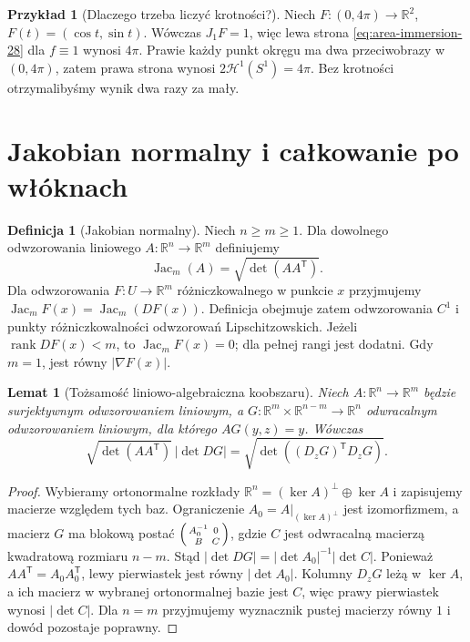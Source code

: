 \documentclass[11pt,a4paper,oneside]{book}
\numberwithin{equation}{chapter}
\theoremstyle{plain}
\newtheorem{lemat}[twierdzenie]{Lemat}
\theoremstyle{definition}
\newtheorem{definicja}[twierdzenie]{Definicja}
\newtheorem{przyklad}[twierdzenie]{Przykład}
\theoremstyle{remark}
\begin{document}
\begin{przyklad}[Dlaczego trzeba liczyć krotności?]
Niech $F:(0,4\pi)\to\mathbb R^2$,
$F(t)=(\cos t,\sin t)$. Wówczas $J_1F=1$,
więc lewa strona \eqref{eq:area-immersion-28}
dla $f\equiv1$ wynosi $4\pi$.
Prawie każdy punkt okręgu ma dwa przeciwobrazy
w $(0,4\pi)$, zatem prawa strona wynosi
$2\mathcal H^1(S^1)=4\pi$.
Bez krotności otrzymalibyśmy wynik dwa razy za mały.
\end{przyklad}

\section{Jakobian normalny i całkowanie po włóknach}
\begin{definicja}[Jakobian normalny]
\label{def:normal-jacobian-28}
Niech $n\ge m\ge1$. Dla dowolnego odwzorowania
liniowego $A:\mathbb R^n\to\mathbb R^m$ definiujemy
\[
 \operatorname{Jac}_m(A)=\sqrt{\det(AA^{\mathsf T})}.
\]
Dla odwzorowania $F:U\to\mathbb R^m$ różniczkowalnego
w punkcie $x$ przyjmujemy
$\operatorname{Jac}_mF(x)=\operatorname{Jac}_m(DF(x))$.
Definicja obejmuje zatem odwzorowania $C^1$ i punkty
różniczkowalności odwzorowań Lipschitzowskich.
Jeżeli $\operatorname{rank}DF(x)<m$, to
$\operatorname{Jac}_mF(x)=0$; dla pełnej rangi
jest dodatni. Gdy $m=1$, jest równy $|\nabla F(x)|$.
\end{definicja}

\begin{lemat}[Tożsamość liniowo-algebraiczna koobszaru]
\label{lem:linear-coarea-28}
Niech $A:\mathbb R^n\to\mathbb R^m$ będzie
surjektywnym odwzorowaniem liniowym, a
$G:\mathbb R^m\times\mathbb R^{n-m}\to\mathbb R^n$
odwracalnym odwzorowaniem liniowym, dla którego
$AG(y,z)=y$. Wówczas
\[
 \sqrt{\det(AA^{\mathsf T})}\,|\det DG|
 =\sqrt{\det((D_zG)^{\mathsf T}D_zG)}.
\]
\end{lemat}
\begin{proof}
Wybieramy ortonormalne rozkłady
$\mathbb R^n=(\ker A)^\perp\oplus\ker A$
i zapisujemy macierze względem tych baz.
Ograniczenie $A_0=A|_{(\ker A)^\perp}$
jest izomorfizmem, a macierz $G$ ma blokową postać
$\begin{psmallmatrix} A_0^{-1}&0\\B&C\end{psmallmatrix}$,
gdzie $C$ jest odwracalną macierzą kwadratową
rozmiaru $n-m$. Stąd
$|\det DG|=|\det A_0|^{-1}|\det C|$.
Ponieważ $AA^{\mathsf T}=A_0A_0^{\mathsf T}$,
lewy pierwiastek jest równy $|\det A_0|$.
Kolumny $D_zG$ leżą w $\ker A$, a ich macierz
w wybranej ortonormalnej bazie jest $C$,
więc prawy pierwiastek wynosi $|\det C|$.
Dla $n=m$ przyjmujemy wyznacznik pustej
macierzy równy $1$ i dowód pozostaje poprawny.
\end{proof}
\end{document}
